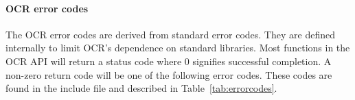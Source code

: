 \paragraph*{OCR error codes}
The OCR error codes are derived from standard error codes. They are defined
internally to limit OCR's dependence on standard libraries. Most functions in the
OCR API will return a status code where 0 signifies successful completion. A non-zero
return code will be one of the following error codes. These codes are found
in the  include file and described in Table~\ref{tab:errorcodes}.
\tablelasttail{\hline}
